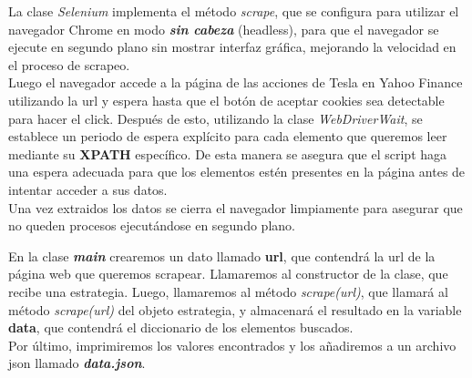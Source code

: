 \documentclass{article} %
\begin{document}
    \hspace*{1cm}La clase \textit{Selenium} implementa el método \textit{scrape}, que se configura para utilizar el navegador 
    Chrome en modo \textit{\textbf{sin cabeza}} (headless), para que el navegador se ejecute en segundo plano sin mostrar
    interfaz gráfica, mejorando la velocidad en el proceso de scrapeo.\\
    Luego el navegador accede a la página de las acciones de Tesla en Yahoo Finance utilizando la url y espera hasta que 
    el botón de aceptar cookies sea detectable para hacer el click. Después de esto, utilizando la clase \textit{WebDriverWait}, 
    se establece un periodo de espera explícito para cada elemento que queremos leer mediante su \textbf{XPATH} específico. De 
    esta manera se asegura que el script haga una espera adecuada para que los elementos estén presentes en la página antes de 
    intentar acceder a sus datos.\\
    Una vez extraidos los datos se cierra el navegador limpiamente para asegurar que no queden procesos ejecutándose en segundo plano.


    \hspace*{1cm}En la clase \textit{\textbf{main}} crearemos un dato llamado \textbf{url}, que contendrá la url de la página
    web que queremos scrapear. Llamaremos al constructor de la clase, que recibe una estrategia. Luego, llamaremos al método
    \textit{scrape(url)}, que llamará al método \textit{scrape(url)} del objeto estrategia, y almacenará el resultado en la 
    variable \textbf{data}, que contendrá el diccionario de los elementos buscados. \\
    Por último, imprimiremos los valores encontrados y los añadiremos a un archivo json llamado \textit{\textbf{data.json}}.
\end{document}
